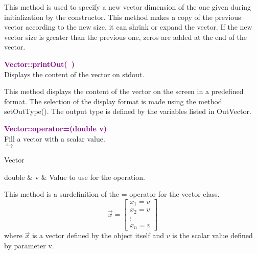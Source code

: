 This method is used to specify a new vector dimension of the one given during initialization by the constructor.
This method makes a copy of the previous vector according to the new size, \ie it can shrink or expand the vector.
If the new vector size is greater than the previous one, zeros are added at the end of the vector.

\textcolor{purple}{\textbf{Vector::printOut(~)}}\label{Vector::printOut()}\\
Displays the content of the vector on stdout.

This method displays the content of the vector on the screen in a predefined format.
The selection of the display format is made using the method setOutType().
The output type is defined by the variables listed in OutVector.

\textcolor{purple}{\textbf{Vector::operator=(double v)}}\label{Vector::operator=(double v)}\\
Fill a vector with a scalar value.\\ \hspace*{5mm}$\hookrightarrow$
\vspace*{-2em}\begin{tcolorbox}[grow to left by=-1cm, width=\textwidth-1cm,myArgs,tabularx={l|R}]
Vector
\end{tcolorbox}

\begin{tcolorbox}[width=\textwidth,myArgs,tabularx={ll|R}]
double & v & Value to use for the operation.
\end{tcolorbox}

This method is a surdefinition of the = operator for the vector class.
\begin{equation*}
\overrightarrow{x}=\left[\begin{array}{c}
  x_{1}=v\\
  x_{2}=v\\
  \vdots\\
  x_{n}=v
  \end{array}\right]
\end{equation*}
where $\overrightarrow{x}$ is a vector defined by the object itself and $v$ is the scalar value defined by parameter v.


